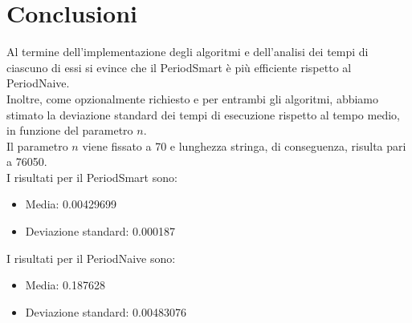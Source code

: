 \chapter{Conclusioni}
Al termine dell'implementazione degli algoritmi e dell'analisi dei tempi di ciascuno di essi si evince che il PeriodSmart è più efficiente rispetto al PeriodNaive.\vspace{2mm}
\\Inoltre, come opzionalmente richiesto e per entrambi gli algoritmi, abbiamo stimato la deviazione standard dei tempi di esecuzione rispetto al tempo medio, in funzione del parametro $n$.
\\Il parametro $n$ viene fissato a 70 e lunghezza stringa, di conseguenza, risulta pari a 76050. \vspace{2mm}
\\I risultati per il PeriodSmart sono:
\begin{itemize}
    \item Media: 0.00429699
    \item Deviazione standard: 0.000187
\end{itemize}
I risultati per il PeriodNaive sono:
\begin{itemize}
    \item Media: 0.187628
    \item Deviazione standard: 0.00483076
\end{itemize}
